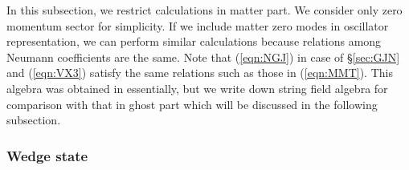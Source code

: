\documentclass[12pt,a4paper]{article}
\begin{document}
In this subsection, we restrict calculations in matter part. We consider only zero momentum sector for simplicity.
If we include matter zero modes in oscillator representation, we can perform similar calculations  because relations among Neumann coefficients are the same.
Note that \coordHE{} (\ref{eqn:NGJ}) in \coordHE{} case of \S \ref{sec:GJN} and \coordHE{} (\ref{eqn:VX3}) satisfy the same relations such as those in (\ref{eqn:MMT}).
This algebra was obtained in \cite{RSZ}\cite{FO} essentially, but we write down string field algebra for comparison with that in ghost part which will be discussed in the following subsection.

\subsubsection{Wedge state}
\end{document}

